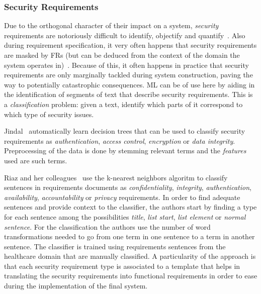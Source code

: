 \subsubsection{Security Requirements}

Due to the orthogonal character of their impact on a system, \emph{security}
requirements are notoriously difficult to identify, objectify and
quantify~\cite{Rashid:2016}. Also during requirement specification, it very
often happens that security requirements are masked by FRs (but can be
deduced from the context of the domain the system operates in)~\cite{Riaz:2014}.
Because of this, it often happens in practice that security requirements are
only marginally tackled during system construction, paving the way
to potentially catastrophic consequences.
ML can be of use here by aiding in the identification of segments
of text that describe security requirements. This is a \emph{classification}
problem: given a text, identify which parts of it correspond to which type of
security issues.

	Jindal\etal~\cite{Jildal:2016} automatically learn decision trees that can be
used to classify security requirements as \emph{authentication}, \emph{access
control}, \emph{encryption} or \emph{data integrity}. Preprocessing of the data
is done by stemming relevant terms and the \emph{features} used
are such terms.

	Riaz and her colleagues~\cite{Riaz:2014} use the k-nearest neighbors algoritm to
classify sentences in requirements documents as \emph{confidentiality},
\emph{integrity}, \emph{authentication}, \emph{availability},
\emph{accountability} or \emph{privacy} requirements. In order to find adequate
sentences and provide context to the classifier, the authors start by finding a
type for each sentence among the possibilities \emph{title}, \emph{list start},
\emph{list element} or \emph{normal sentence}. For the classification the
authors use the number of word transformations needed to go from one term in one sentence to a term in
another sentence. The classifier is trained using requirements sentences from
the healthcare domain that are manually classified. A particularity of the
approach is that each security requirement type is associated to a template that
helps in translating the security requirements into functional requirements in
order to ease during the implementation of the final system.

